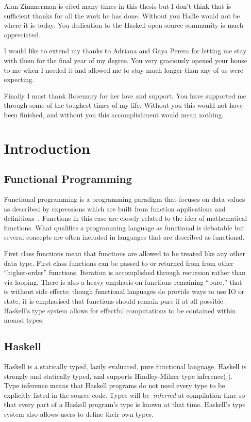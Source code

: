 \begin{preface}
Alan Zimmerman is cited many times in this thesis but I don't think that is sufficient thanks for all the work he has done. Without you HaRe would not be where it is today. You dedication to the Haskell open source community is much appreciated.

I would like to extend my thanks to Adriana and Gaya Perera for letting me stay with them for the final year of my degree. You very graciously opened your house to me when I needed it and allowed me to stay much longer than any of us were expecting.

Finally I must thank Rosemary for her love and support. You have supported me through some of the toughest times of my life. Without you this would not have been finished, and without you this accomplishment would mean nothing.

\end{preface}

\chapter{Introduction}\label{chp:intro}


\section{Functional Programming}
Functional programming is a programming paradigm that focuses on data values as described by expressions which are built from function applications and definitions~\citep{elementsOfFunc}.  Functions in this case are closely related to the idea of mathematical functions. What qualifies a programming language as functional is debatable but several concepts are often included in languages that are described as functional. 

First class functions mean that functions are allowed to be treated like any other data type. First class functions can be passed to or returned from from other ``higher-order'' functions. Iteration is accomplished through recursion rather than via looping. There is also a heavy emphasis on functions remaining ``pure,'' that is without side effects; though functional languages do provide ways to use IO or state, it is emphasised that functions should remain pure if at all possible. Haskell's type system allows for effectful computations to be contained within monad types.
  
\section{Haskell}
\label{haskell}
Haskell is a statically typed, lazily evaluated, pure functional language. Haskell is strongly and statically typed, and supports Hindley-Milner type inference(\cite{hindley};\cite{milner}). Type inference means that Haskell programs do not need every type to be explicitly listed in the source code. Types will be~\textit{inferred} at compilation time so that every part of a Haskell program's type is known at that time. Haskell's type system also allows users to define their own types.

